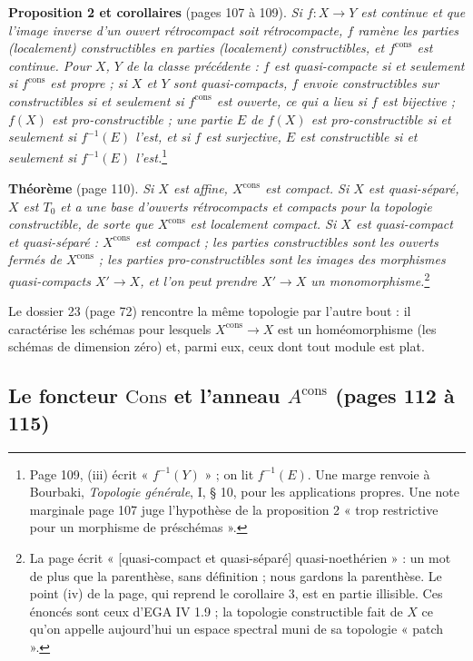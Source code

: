 \documentclass[11pt,a4paper]{article}
\begin{document}
\textbf{Proposition 2 et corollaires} (pages 107 à 109). \emph{Si $f : X \to Y$
est continue et que l'image inverse d'un ouvert rétrocompact soit
rétrocompacte, $f$ ramène les parties (localement) constructibles en parties
(localement) constructibles, et $f^{\mathrm{cons}}$ est continue. Pour $X$, $Y$ de
la classe précédente : $f$ est quasi-compacte si et seulement si
$f^{\mathrm{cons}}$ est propre ; si $X$ et $Y$ sont quasi-compacts, $f$ envoie
constructibles sur constructibles si et seulement si $f^{\mathrm{cons}}$ est
ouverte, ce qui a lieu si $f$ est bijective ; $f(X)$ est pro-constructible ;
une partie $E$ de $f(X)$ est pro-constructible si et seulement si $f^{-1}(E)$
l'est, et si $f$ est surjective, $E$ est constructible si et seulement si
$f^{-1}(E)$ l'est.}\footnote{Page 109, (iii) écrit « $f^{-1}(Y)$ » ; on lit
$f^{-1}(E)$. Une marge renvoie à Bourbaki, \emph{Topologie générale}, I, § 10,
pour les applications propres. Une note marginale page 107 juge l'hypothèse de
la proposition 2 « trop restrictive pour un morphisme de préschémas ».}

\textbf{Théorème} (page 110). \emph{Si $X$ est affine, $X^{\mathrm{cons}}$ est
compact. Si $X$ est quasi-séparé, $X$ est $T_0$ et a une base d'ouverts
rétrocompacts et compacts pour la topologie constructible, de sorte que
$X^{\mathrm{cons}}$ est localement compact. Si $X$ est quasi-compact et
quasi-séparé : $X^{\mathrm{cons}}$ est compact ; les parties constructibles sont
les ouverts fermés de $X^{\mathrm{cons}}$ ; les parties pro-constructibles sont
les images des morphismes quasi-compacts $X' \to X$, et l'on peut prendre
$X' \to X$ un monomorphisme.}\footnote{La page écrit « [quasi-compact et
quasi-séparé] quasi-noethérien » : un mot de plus que la parenthèse, sans
définition ; nous gardons la parenthèse. Le point (iv) de la page, qui reprend
le corollaire 3, est en partie illisible. Ces énoncés sont ceux d'EGA IV 1.9 ;
la topologie constructible fait de $X$ ce qu'on appelle aujourd'hui un espace
spectral muni de sa topologie « patch ».}

Le dossier 23 (page 72) rencontre la même topologie par l'autre bout : il
caractérise les schémas pour lesquels $X^{\mathrm{cons}} \to X$ est un
homéomorphisme (les schémas de dimension zéro) et, parmi eux, ceux dont tout
module est plat.

\subsection*{Le foncteur $\mathrm{Cons}$ et l'anneau $A^{\mathrm{cons}}$ (pages 112 à 115)}
\end{document}
